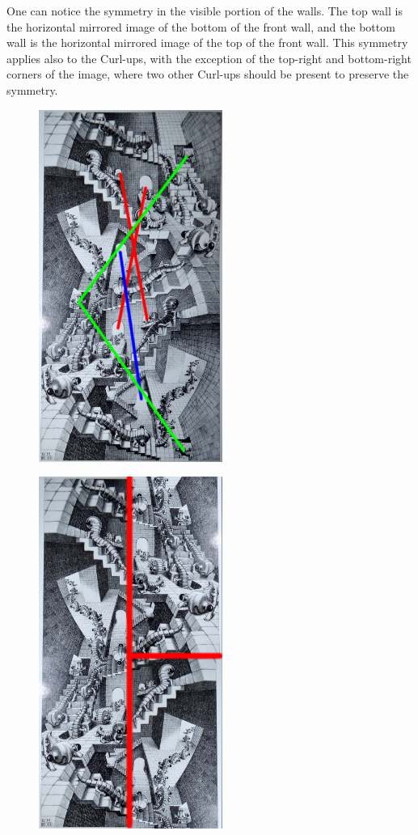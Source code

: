 \documentclass[12pt, a4paper]{article}
\begin{document}
One can notice the symmetry in the visible portion of the walls. The top wall is the horizontal mirrored image of the bottom of the front wall, and the bottom wall is the horizontal mirrored image of the top of the front wall. This symmetry applies also to the Curl-ups, with the exception of the top-right and bottom-right corners of the image, where two other Curl-ups should be present to preserve the symmetry.\\

\begin{center}
\begin{figure}[H]
\centering\includegraphics[width=6cm]{./mirror.png}\\
\end{figure}
\end{center}

\begin{center}
\begin{figure}[H]
\centering\includegraphics[width=6cm]{./mirror2.png}\\
\end{figure}
\end{center}
\end{document}
